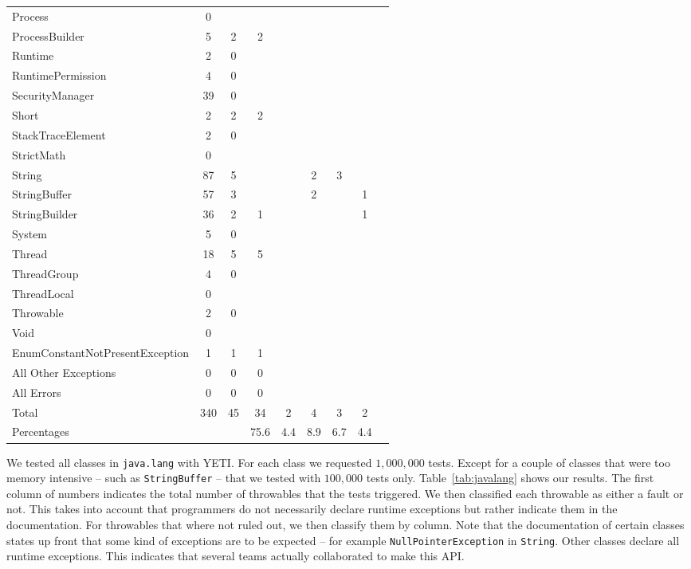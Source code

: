 \begin{table*}[ht!]
{\begin{minipage}{\textwidth}
{\begin{center}
\begin{tabular}{l c c c c c c c c}
Process &0&&&&&&\\
ProcessBuilder &5&2&2&&&&\\
Runtime &2&0&&&&&\\
RuntimePermission &4&0&&&&&\\
SecurityManager &39&0&&&&&\\
Short &2&2&2&&&&\\
StackTraceElement &2&0&&&&&\\
StrictMath &0&&&&&&\\
String &87&5&&&2&3&\\
StringBuffer &57&3&&&2&&1\\
StringBuilder &36&2&1&&&&1\\
System &5&0&&&&&\\
Thread &18&5&5&&&&\\
ThreadGroup &4&0&&&&&\\
ThreadLocal &0&&&&&&\\
Throwable &2&0&&&&&\\
Void&0&&&&&&\\
EnumConstantNotPresentException&1&1&1&&&&\\
All Other Exceptions  &0&0&0&&&&\\
All Errors  &0&0&0&&&&\\
\hline
Total&340&45&34&2&4&3&2\\
\hline
Percentages&&&75.6&4.4&8.9&6.7&4.4\\
\hline
\end{tabular}
\end{center}
}
\end{minipage}}

\end{table*}

We tested all classes in \texttt{java.lang} with YETI. For each class we requested $1,000,000$ tests. Except for a couple of classes that were too memory intensive -- such as \texttt{StringBuffer} -- that we tested with $100,000$ tests only.
Table~\ref{tab:javalang} shows our results. The first column of numbers indicates the total number of
throwables that the tests triggered. We then classified each throwable as either a fault or not. This takes into account that programmers do not necessarily declare runtime exceptions but rather indicate them in the documentation. For throwables that where not ruled out, 
we then classify them by column. Note that the documentation of certain classes states up front that
some kind of exceptions are to be expected -- for example \texttt{NullPointerException} in \texttt{String}.
Other classes declare all runtime exceptions. This indicates that several teams actually collaborated to make this API. 

